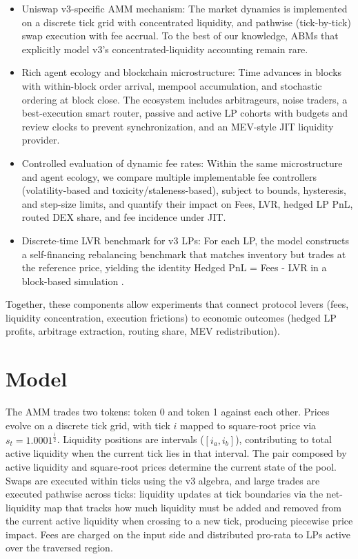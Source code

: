 \documentclass[11pt]{article}
\begin{document}
\begin{itemize}
    \item Uniswap v3-specific AMM mechanism: The market dynamics is implemented on a discrete tick grid with concentrated 
    liquidity, and pathwise (tick-by-tick) swap execution with fee accrual. To the best of our knowledge, ABMs that explicitly 
    model v3’s concentrated-liquidity accounting remain rare.
    \item Rich agent ecology and blockchain microstructure: Time advances in blocks with within-block order arrival, 
    mempool accumulation, and stochastic ordering at block close. The ecosystem includes arbitrageurs, noise traders, a 
    best-execution smart router, passive and active LP cohorts with budgets and 
    review clocks to prevent synchronization, and an MEV-style JIT liquidity provider.
    \item Controlled evaluation of dynamic fee rates: Within the same microstructure and agent ecology, we compare multiple 
    implementable fee controllers (volatility-based and toxicity/staleness-based), subject to bounds, hysteresis, and 
    step-size limits, and quantify their impact on Fees, LVR, hedged LP PnL, routed DEX share, and fee incidence under JIT.
    \item Discrete-time LVR benchmark for v3 LPs: For each LP, the model constructs a self-financing rebalancing benchmark 
    that matches inventory but trades at the reference price, yielding the identity Hedged PnL = Fees - LVR in a block-based simulation \cite{milionis2023}. 
\end{itemize}

Together, these components allow experiments that connect protocol levers (fees, liquidity concentration, execution frictions) to economic outcomes 
(hedged LP profits, arbitrage extraction, routing share, MEV redistribution).

\section{Model}

The AMM trades two tokens: token 0 and token 1 against each other. Prices evolve on a discrete tick grid, with tick $i$ 
mapped to square-root price via $s_t=1.0001^{\frac{i}{2}}$. Liquidity positions are intervals ($[i_a,i_b]$), 
contributing to total active liquidity when the current tick lies in that interval. The pair composed by active liquidity 
and square-root prices determine the current state of the pool. Swaps are executed within ticks using the v3 algebra, and large 
trades are executed pathwise across ticks: liquidity updates at tick boundaries via the net-liquidity map that tracks how much 
liquidity must be added and removed from the current active liquidity when crossing to a new tick, producing piecewise price impact. 
Fees are charged on the input side and distributed pro-rata to LPs active over the traversed region. 
\end{document}
